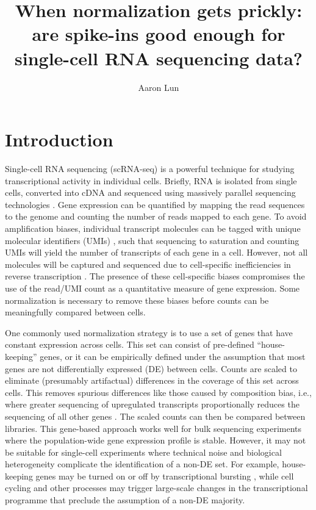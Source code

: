 \documentclass{article}
\title{When normalization gets prickly: are spike-ins good enough for single-cell RNA sequencing data?}
\author{Aaron Lun}
\begin{document}
\maketitle

\section{Introduction}
Single-cell RNA sequencing (scRNA-seq) is a powerful technique for studying transcriptional activity in individual cells.
Briefly, RNA is isolated from single cells, converted into cDNA and sequenced using massively parallel sequencing technologies \cite{shapiro2013singlecell}.
Gene expression can be quantified by mapping the read sequences to the genome and counting the number of reads mapped to each gene.
To avoid amplification biases, individual transcript molecules can be tagged with unique molecular identifiers (UMIs) \cite{islam2014quantitative}, such that sequencing to saturation and counting UMIs will yield the number of transcripts of each gene in a cell.
However, not all molecules will be captured and sequenced due to cell-specific inefficiencies in reverse transcription \cite{stegle2015computational}.
The presence of these cell-specific biases compromises the use of the read/UMI count as a quantitative measure of gene expression.
Some normalization is necessary to remove these biases before counts can be meaningfully compared between cells.

One commonly used normalization strategy is to use a set of genes that have constant expression across cells.
This set can consist of pre-defined ``house-keeping'' genes, or it can be empirically defined under the assumption that most genes are not differentially expressed (DE) between cells.
Counts are scaled to eliminate (presumably artifactual) differences in the coverage of this set across cells.
This removes spurious differences like those caused by composition bias, i.e., where greater sequencing of upregulated transcripts proportionally reduces the sequencing of all other genes \cite{robinson2010tmm}.
The scaled counts can then be compared between libraries.
This gene-based approach works well for bulk sequencing experiments where the population-wide gene expression profile is stable.
However, it may not be suitable for single-cell experiments where technical noise and biological heterogeneity complicate the identification of a non-DE set. 
For example, house-keeping genes may be turned on or off by transcriptional bursting \cite{marinov2014singlecell}, while cell cycling and other processes may trigger large-scale changes in the transcriptional programme that preclude the assumption of a non-DE majority.
\end{document}
